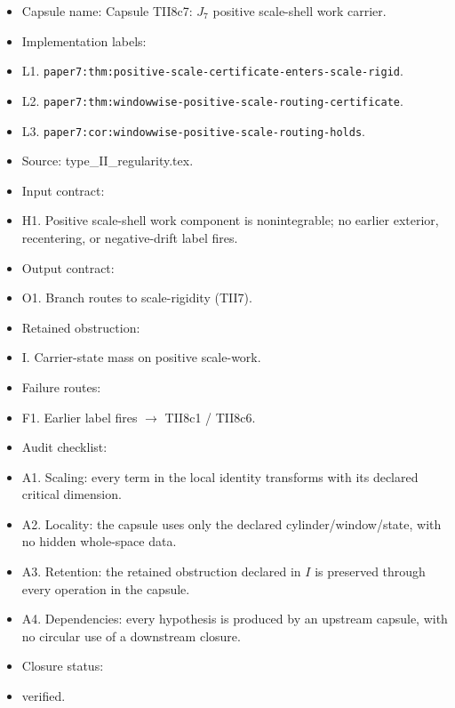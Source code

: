 \documentclass[11pt]{amsart}
\begin{document}
\begin{itemize}
  \item Capsule name: Capsule TII8c7: $J_7$ positive scale-shell work carrier.
  \item Implementation labels:
  \item L1. \texttt{paper7:thm:positive-scale-certificate-enters-scale-rigid}.
  \item L2. \texttt{paper7:thm:windowwise-positive-scale-routing-certificate}.
  \item L3. \texttt{paper7:cor:windowwise-positive-scale-routing-holds}.
  \item Source: type\_II\_regularity.tex.
  \item Input contract:
  \item H1. Positive scale-shell work component is nonintegrable; no earlier exterior, recentering, or negative-drift label fires.
  \item Output contract:
  \item O1. Branch routes to scale-rigidity (TII7).
  \item Retained obstruction:
  \item I. Carrier-state mass on positive scale-work.
  \item Failure routes:
  \item F1. Earlier label fires $\to$ TII8c1 / TII8c6.
  \item Audit checklist:
  \item A1. Scaling: every term in the local identity transforms with its declared critical dimension.
  \item A2. Locality: the capsule uses only the declared cylinder/window/state, with no hidden whole-space data.
  \item A3. Retention: the retained obstruction declared in $I$ is preserved through every operation in the capsule.
  \item A4. Dependencies: every hypothesis is produced by an upstream capsule, with no circular use of a downstream closure.
  \item Closure status:
  \item verified.
\end{itemize}
\end{document}
